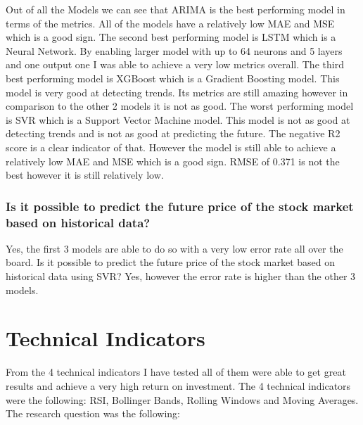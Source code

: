 \documentclass{imc-inf}
\begin{document}
	Out of all the Models we can see that ARIMA is the best performing model in terms of the metrics. All of the models have a relatively low MAE and MSE which is a good sign. The second best performing model is LSTM which is a Neural Network.
	By enabling larger model with up to 64 neurons and 5 layers and one output one I was able to achieve a very low metrics overall. The third best performing model is XGBoost which is a Gradient Boosting model. This model is very good at detecting trends.
	Its metrics are still amazing however in comparison to the other 2 models it is not as good. The worst performing model is SVR which is a Support Vector Machine model. This model is not as good at detecting trends and is not as good at predicting the future.
	The negative R2 score is a clear indicator of that. However the model is still able to achieve a relatively low MAE and MSE which is a good sign. RMSE of 0.371 is not the best however it is still relatively low.
	\subsubsection{Is it possible to predict the future price of the stock market based on historical data?}
	Yes, the first 3 models are able to do so with a very low error rate all over the board. 
	Is it possible to predict the future price of the stock market based on historical data using SVR? Yes, however the error rate is higher than the other 3 models.
	
	\section{Technical Indicators}
	From the 4 technical indicators I have tested all of them were able to get great results and achieve a very high return on investment. The 4 technical indicators were the following: RSI, Bollinger Bands, Rolling Windows and Moving Averages.
	The research question was the following:
\end{document}

